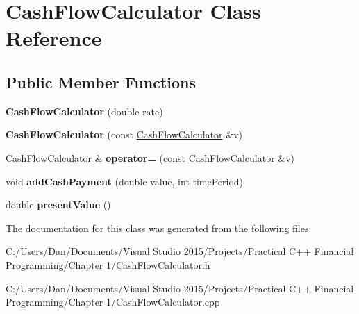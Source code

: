 \hypertarget{class_cash_flow_calculator}{}\section{Cash\+Flow\+Calculator Class Reference}
\label{class_cash_flow_calculator}
\subsection*{Public Member Functions}
\begin{DoxyCompactItemize}
\item 
\hypertarget{class_cash_flow_calculator_aa6b1aca2399041072819f3b0b939f32a}{}\label{class_cash_flow_calculator_aa6b1aca2399041072819f3b0b939f32a} 
{\bfseries Cash\+Flow\+Calculator} (double rate)
\item 
\hypertarget{class_cash_flow_calculator_a90ef91c1fdbfcf5721b99d957325d6b1}{}\label{class_cash_flow_calculator_a90ef91c1fdbfcf5721b99d957325d6b1} 
{\bfseries Cash\+Flow\+Calculator} (const \hyperlink{class_cash_flow_calculator}{Cash\+Flow\+Calculator} \&v)
\item 
\hypertarget{class_cash_flow_calculator_a0bfd61fdaca715587bcda30b6a997daa}{}\label{class_cash_flow_calculator_a0bfd61fdaca715587bcda30b6a997daa} 
\hyperlink{class_cash_flow_calculator}{Cash\+Flow\+Calculator} \& {\bfseries operator=} (const \hyperlink{class_cash_flow_calculator}{Cash\+Flow\+Calculator} \&v)
\item 
\hypertarget{class_cash_flow_calculator_ac590efbd3e2350c5c3bf5536e9bb4803}{}\label{class_cash_flow_calculator_ac590efbd3e2350c5c3bf5536e9bb4803} 
void {\bfseries add\+Cash\+Payment} (double value, int time\+Period)
\item 
\hypertarget{class_cash_flow_calculator_a74e1d5ec9db4f237b851ed3575579d75}{}\label{class_cash_flow_calculator_a74e1d5ec9db4f237b851ed3575579d75} 
double {\bfseries present\+Value} ()
\end{DoxyCompactItemize}


The documentation for this class was generated from the following files\+:\begin{DoxyCompactItemize}
\item 
C\+:/\+Users/\+Dan/\+Documents/\+Visual Studio 2015/\+Projects/\+Practical C++ Financial Programming/\+Chapter 1/Cash\+Flow\+Calculator.\+h\item 
C\+:/\+Users/\+Dan/\+Documents/\+Visual Studio 2015/\+Projects/\+Practical C++ Financial Programming/\+Chapter 1/Cash\+Flow\+Calculator.\+cpp\end{DoxyCompactItemize}
